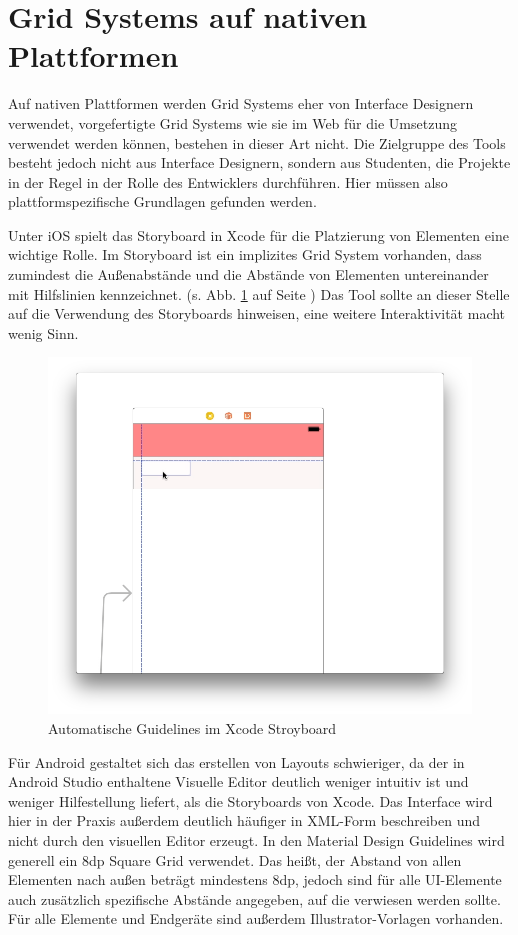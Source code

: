 \section{Grid Systems auf nativen Plattformen}
Auf nativen Plattformen werden Grid Systems eher von Interface Designern verwendet, vorgefertigte Grid Systems  wie sie im Web für die Umsetzung verwendet werden können, bestehen in dieser Art nicht. Die Zielgruppe des Tools besteht jedoch nicht aus Interface Designern, sondern aus Studenten, die Projekte in der Regel in der Rolle des Entwicklers durchführen. Hier müssen also plattformspezifische Grundlagen gefunden werden.

Unter iOS spielt das Storyboard in Xcode für die Platzierung von Elementen eine wichtige Rolle. Im Storyboard ist ein implizites Grid System vorhanden, dass zumindest die Außenabstände und die Abstände von Elementen untereinander mit Hilfslinien kennzeichnet. (s. Abb. \ref{fig:xcode-guides} auf Seite \pageref{fig:xcode-guides})
Das Tool sollte an dieser Stelle auf die Verwendung des Storyboards hinweisen, eine weitere Interaktivität macht wenig Sinn.

\begin{figure}[h]
    \centering
    \includegraphics[width=1\textwidth]{images/xcode-guidelines.png}
    \caption{Automatische Guidelines im Xcode Stroyboard}
    \label{fig:xcode-guides}
\end{figure}

Für Android gestaltet sich das erstellen von Layouts schwieriger, da der in Android Studio enthaltene Visuelle Editor deutlich weniger intuitiv ist und weniger Hilfestellung liefert, als die Storyboards von Xcode. Das Interface wird hier in der Praxis außerdem deutlich häufiger in XML-Form beschreiben und nicht durch den visuellen Editor erzeugt. In den Material Design Guidelines wird generell ein 8dp Square Grid verwendet. Das heißt, der Abstand von allen Elementen nach außen beträgt mindestens 8dp, jedoch sind für alle UI-Elemente auch zusätzlich spezifische Abstände angegeben, auf die verwiesen werden sollte. Für alle Elemente und Endgeräte sind außerdem Illustrator-Vorlagen vorhanden. 

